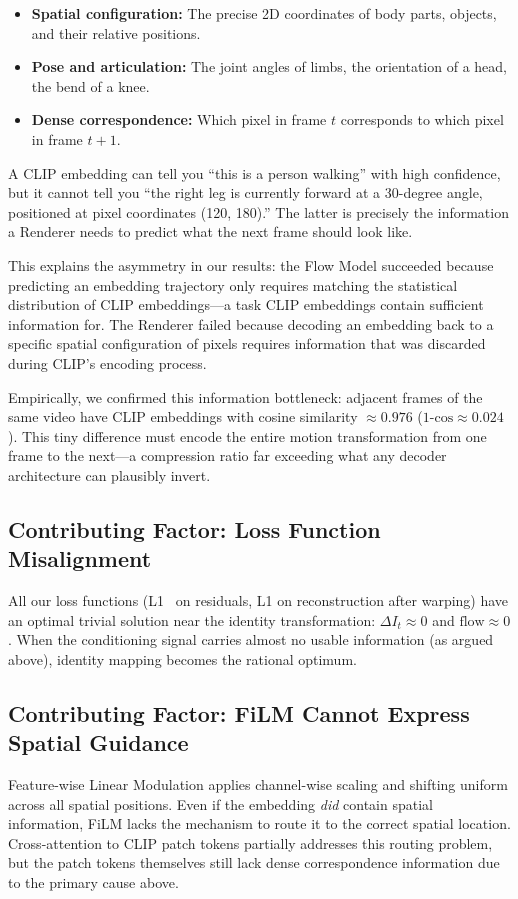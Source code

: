 \documentclass[10pt,twocolumn,letterpaper]{article}
\begin{document}
\begin{itemize}
    \item \textbf{Spatial configuration:} The precise 2D coordinates of
    body parts, objects, and their relative positions.
    \item \textbf{Pose and articulation:} The joint angles of limbs, the
    orientation of a head, the bend of a knee.
    \item \textbf{Dense correspondence:} Which pixel in frame $t$
    corresponds to which pixel in frame $t+1$.
\end{itemize}

A CLIP embedding can tell you ``this is a person walking'' with high
confidence, but it cannot tell you ``the right leg is currently forward
at a 30-degree angle, positioned at pixel coordinates (120, 180).'' The
latter is precisely the information a Renderer needs to predict what the
next frame should look like.

This explains the asymmetry in our results: the Flow Model succeeded
because predicting an embedding trajectory only requires matching the
statistical distribution of CLIP embeddings---a task CLIP embeddings
contain sufficient information for. The Renderer failed because decoding
an embedding back to a specific spatial configuration of pixels requires
information that was discarded during CLIP's encoding process.

Empirically, we confirmed this information bottleneck: adjacent frames of
the same video have CLIP embeddings with cosine similarity $\approx 0.976$
($\text{1-cos} \approx 0.024$). This tiny difference must encode the entire
motion transformation from one frame to the next---a compression ratio far
exceeding what any decoder architecture can plausibly invert.

\subsection{Contributing Factor: Loss Function Misalignment}
All our loss functions (L1~\cite{isola2017} on residuals, L1 on reconstruction after
warping) have an optimal trivial solution near the identity transformation:
$\Delta I_t \approx 0$ and $\text{flow} \approx 0$. When the conditioning
signal carries almost no usable information (as argued above), identity
mapping becomes the rational optimum.

\subsection{Contributing Factor: FiLM Cannot Express Spatial Guidance}
Feature-wise Linear Modulation applies channel-wise scaling and shifting
uniform across all spatial positions. Even if the embedding \emph{did}
contain spatial information, FiLM lacks the mechanism to route it to the
correct spatial location. Cross-attention to CLIP patch tokens partially
addresses this routing problem, but the patch tokens themselves still lack
dense correspondence information due to the primary cause above.
\end{document}
